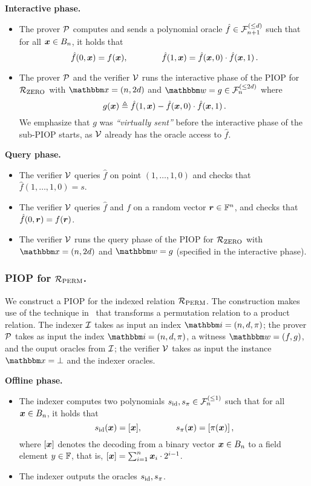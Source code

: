 \textbf{Interactive phase.} 
\begin{itemize}
    \item The prover $\mathcal{P}$ computes and sends a polynomial oracle $\hat{f} \in {\mathcal{F}}_{n+1}^{(\le{d})}$ such that 
    for all $\boldsymbol{x} \in B_{n}$, it holds that
    \[
      \hat{f}(0, \boldsymbol{x}) = f(\boldsymbol{x}), \qquad \qquad \hat{f}(1, \boldsymbol{x}) = \hat{f}(\boldsymbol{x}, 0) \cdot \hat{f}(\boldsymbol{x}, 1)\,.
    \]
    \item The prover $\mathcal{P}$ and the verifier $\mathcal{V}$ runs the interactive phase of 
        the PIOP for ${\mathcal{R}}_{\text{ZERO}}$ with $\instR = (n, 2d)$ and $\witR = g \in \bdp{n}{2d}$ where
        \[
            g(\boldsymbol{x}) \mathrel{\triangleq} \hat{f}(1, \boldsymbol{x}) - \hat{f}(\boldsymbol{x}, 0) \cdot \hat{f}(\boldsymbol{x}, 1) \,.
        \]
        We emphasize that $g$ was \emph{``virtually sent''} before the interactive phase of the sub-PIOP starts,
        as $\mathcal{V}$ already has the oracle access to $\hat{f}$.
\end{itemize}

\textbf{Query phase.}
\begin{itemize}
    \item The verifier $\mathcal{V}$ queries $\hat{f}$ on point $(1, \dots, 1, 0)$ and checks that
        $\hat{f}(1,\dots, 1, 0) = s$.
    \item The verifier $\mathcal{V}$ queries $\hat{f}$ and $f$ on a random vector $\boldsymbol{r} \in \mathbb{F}^n$,
        and checks that $\hat{f}(0, \boldsymbol{r}) = f(\boldsymbol{r})$.
    \item The verifier $\mathcal{V}$ runs the query phase of the PIOP 
    for ${\mathcal{R}}_{\text{ZERO}}$ with $\instR = (n, 2d)$ and $\witR = g$ (specified in the interactive phase).
\end{itemize}

\subsubsection*{PIOP for ${\mathcal{R}}_{\text{PERM}}$.}
We construct a PIOP for the indexed relation ${\mathcal{R}}_{\text{PERM}}$.
The construction makes use of the technique in~\cite{GWC19} that 
transforms a permutation relation to a product relation.
The indexer $\mathcal{I}$ takes as input an index $\idxR = (n, d, \perm)$;
the prover $\mathcal{P}$ takes as input the index $\idxR = (n, d, \perm)$,
a witness $\witR = (f, g)$, and the ouput oracles from $\mathcal{I}$;
the verifier $\mathcal{V}$ takes as input the instance $\instR = \bot$ and 
the indexer oracles.

\textbf{Offline phase.}
\begin{itemize}
    \item The indexer computes two polynomials $s_{\text{id}}, s_{\pi} \in {\mathcal{F}}_{n}^{(\le{1})}$ such that
    for all $\boldsymbol{x} \in B_{n}$, it holds that 
    \[
        s_{\text{id}}(\boldsymbol{x}) = [\boldsymbol{x}], \qquad\qquad s_{\pi}(\boldsymbol{x}) = [\pi(\boldsymbol{x})]\,,
    \]
    where $[\boldsymbol{x}]$ denotes the decoding from a binary vector $\boldsymbol{x} \in B_{n}$
    to a field element $y \in \mathbb{F}$, that is, $[\boldsymbol{x}] = \sum_{i=1}^{n} \boldsymbol{x}_i \cdot 2^{i-1}$.
    \item The indexer outputs the oracles $s_{\text{id}}, s_{\pi}$.
\end{itemize}

